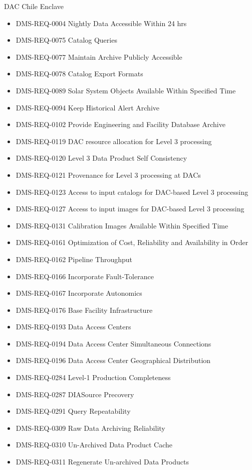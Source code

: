 DAC Chile Enclave \begin{itemize}
\item DMS-REQ-0004 Nightly Data Accessible Within 24 hrs
\item DMS-REQ-0075 Catalog Queries
\item DMS-REQ-0077 Maintain Archive Publicly Accessible
\item DMS-REQ-0078 Catalog Export Formats
\item DMS-REQ-0089 Solar System Objects Available Within Specified Time
\item DMS-REQ-0094 Keep Historical Alert Archive
\item DMS-REQ-0102 Provide Engineering and Facility Database Archive
\item DMS-REQ-0119 DAC resource allocation for Level 3 processing
\item DMS-REQ-0120 Level 3 Data Product Self Consistency
\item DMS-REQ-0121 Provenance for Level 3 processing at DACs
\item DMS-REQ-0123 Access to input catalogs for DAC-based Level 3 processing
\item DMS-REQ-0127 Access to input images for DAC-based Level 3 processing
\item DMS-REQ-0131 Calibration Images Available Within Specified Time
\item DMS-REQ-0161 Optimization of Cost, Reliability and Availability in Order
\item DMS-REQ-0162 Pipeline Throughput
\item DMS-REQ-0166 Incorporate Fault-Tolerance
\item DMS-REQ-0167 Incorporate Autonomics
\item DMS-REQ-0176 Base Facility Infrastructure
\item DMS-REQ-0193 Data Access Centers
\item DMS-REQ-0194 Data Access Center Simultaneous Connections
\item DMS-REQ-0196 Data Access Center Geographical Distribution
\item DMS-REQ-0284 Level-1 Production Completeness
\item DMS-REQ-0287 DIASource Precovery
\item DMS-REQ-0291 Query Repeatability
\item DMS-REQ-0309 Raw Data Archiving Reliability
\item DMS-REQ-0310 Un-Archived Data Product Cache
\item DMS-REQ-0311 Regenerate Un-archived Data Products

\end{itemize}
